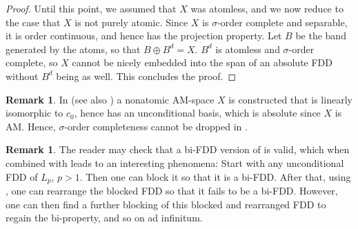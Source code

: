 \documentclass[12pt,leqno]{amsart}
\numberwithin{equation}{section}
\theoremstyle{definition}
\newtheorem{remark}[theorem]{Remark}
\newtheorem{example}[theorem]{Example}
\begin{document}
\begin{proof}

Until this point, we assumed that $X$ was atomless, and we now reduce to the case that $X$ is not purely atomic. Since $X$ is $\sigma$-order complete and separable, it is order continuous, and hence has the projection property. Let $B$ be the band generated by the atoms, so that $B\oplus B^d=X$. $B^d$ is atomless and $\sigma$-order complete, so $X$ cannot be nicely embedded into the span of an absolute FDD without  $B^d$ being as well. This concludes the proof.
%
\end{proof}
\begin{remark}
In \cite{LW} (see also \cite{Mc95}) a nonatomic AM-space $X$ is constructed that is linearly isomorphic to $c_0$, hence has an unconditional basis, which is absolute since $X$ is AM. Hence, $\sigma$-order completeness cannot be dropped in . 
\end{remark}
\begin{remark}
     The reader may check that a bi-FDD version of  is  valid, which  when combined with  leads to an interesting phenomena:  Start with any unconditional FDD of $L_p$, $p>1$. Then one can block it so that it is a bi-FDD. After that, using , one can rearrange the blocked FDD so that it fails to be a bi-FDD. However, one can then find a further blocking of this blocked and rearranged FDD to regain the bi-property, and so on ad infinitum.
\end{remark}




\end{document}
